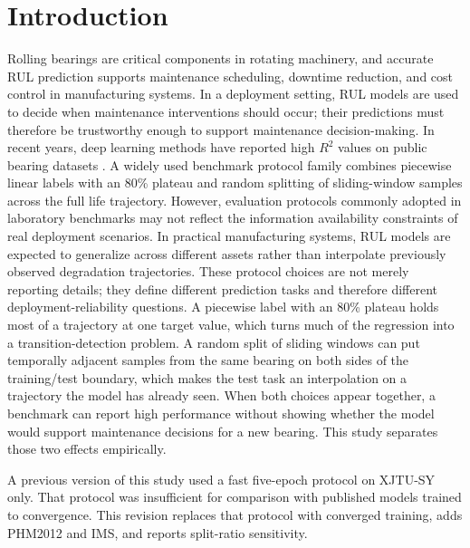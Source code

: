 \documentclass[pdflatex,sn-mathphys-num]{sn-jnl}
\begin{document}
\section{Introduction}
Rolling bearings are critical components in rotating machinery, and accurate RUL prediction supports maintenance scheduling, downtime reduction, and cost control in manufacturing systems. In a deployment setting, RUL models are used to decide when maintenance interventions should occur; their predictions must therefore be trustworthy enough to support maintenance decision-making. In recent years, deep learning methods have reported high $R^2$ values on public bearing datasets \cite{rul_lstm_uq_2022,reg_lstm_2021,gru_tim_2021,transformer_tim_2023}. A widely used benchmark protocol family combines piecewise linear labels with an 80\% plateau and random splitting of sliding-window samples across the full life trajectory. However, evaluation protocols commonly adopted in laboratory benchmarks may not reflect the information availability constraints of real deployment scenarios.
In practical manufacturing systems, RUL models are expected to generalize across different assets rather than interpolate previously observed degradation trajectories. These protocol choices are not merely reporting details; they define different prediction tasks and therefore different deployment-reliability questions. A piecewise label with an 80\% plateau holds most of a trajectory at one target value, which turns much of the regression into a transition-detection problem. A random split of sliding windows can put temporally adjacent samples from the same bearing on both sides of the training/test boundary, which makes the test task an interpolation on a trajectory the model has already seen. When both choices appear together, a benchmark can report high performance without showing whether the model would support maintenance decisions for a new bearing. This study separates those two effects empirically.

A previous version of this study used a fast five-epoch protocol on XJTU-SY only. That protocol was insufficient for comparison with published models trained to convergence. This revision replaces that protocol with converged training, adds PHM2012 and IMS, and reports split-ratio sensitivity.
\end{document}
